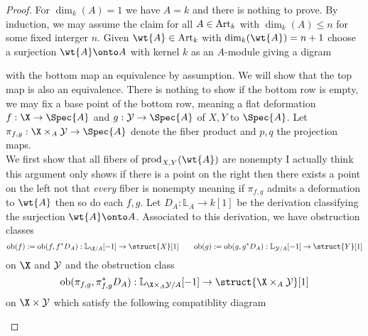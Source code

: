\documentclass[12pt]{article}
\newcommand{\LL}{\mathbb{L}}
\newcommand{\ob}{\mathrm{ob}}
\begin{document}
\begin{proof}
For $\dim_k(A) = 1$ we have $A = k$ and there is nothing to prove. By induction, we may assume the claim for all $A \in \mathrm{Art}_k$ with $\dim_k(A) \le n$ for some fixed interger $n$. Given $\wt{A} \in \Art_k$ with $\dim_k(\wt{A}) = n + 1$ choose a surjection $\wt{A} \onto A$ with kernel $k$ as an $A$-module giving a digram
\begin{center}
\end{center}
with the bottom map an equivalence by assumption. We will show that the top map is also an equivalence. There is nothing to show if the bottom row is empty, we may fix a base point of the bottom row, meaning a flat deformation $f : \X \to \Spec{A}$ and $g : \Y \to \Spec{A}$ of $X, Y$ to $\Spec{A}$. Let $\pi_{f,g} : \X \times_A \Y \to \Spec{A}$ denote the fiber product and $p, q$ the projection maps.
\bigskip\\
We first show that all fibers of $\mathrm{prod}_{X,Y}(\wt{A})$ are nonempty {\color{red} I actually think this argument only shows if there is a point on the right then there exists a point on the left not that \textit{every} fiber is nonempty} meaning if $\pi_{f,g}$ admits a deformation to $\wt{A}$ then so do each $f, g$. Let $D_A : \LL_A \to k[1]$ be the derivation classifying the surjection $\wt{A} \onto A$. Associated to this derivation, we have obstruction classes
\[ \ob(f) := \ob(f, f^* D_A) : \LL_{\X/A}[-1] \to \struct{X}[1] \quad \quad \ob(g) := \ob(g, g^* D_A) : \LL_{\Y/A}[-1] \to \struct{Y}[1] \]
on $\X$ and $\mathcal{Y}$ and the obstruction class
\[ \ob(\pi_{f,g}, \pi_{f,g}^* D_A) : \LL_{\X \times_A \Y/A} [-1] \to \struct{\X \times_A \Y}[1] \]
on $\X \times \Y$ which satisfy the following compatiblity diagram
\begin{center}

\end{center}
\end{proof}
\end{document}
